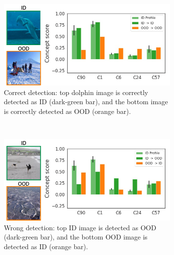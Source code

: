 \begin{figure}[t]
     \centering
     \begin{subfigure}[b]{\columnwidth}
         \centering
         \includegraphics[width=\textwidth]{figures/figure1a.png}
         \caption{\small Correct detection: top dolphin image is correctly detected as ID (dark-green bar), and the bottom image is correctly detected as OOD (orange bar).}
         \label{fig:fig1a}
     \end{subfigure}
     \\
     \vspace{1mm}
     \begin{subfigure}[b]{\columnwidth}
         \centering
         \includegraphics[width=\textwidth]{figures/figure1b.png}
         \caption{\small Wrong detection: top ID image is detected as OOD (dark-green bar), and the bottom OOD image is detected as ID (orange bar).}
         \label{fig:fig1b}
     \end{subfigure}
     \\
     \vspace{1mm}
     \begin{subfigure}[b]{\columnwidth}

\end{subfigure}
\end{figure}
